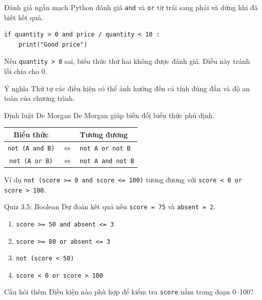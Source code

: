 \documentclass[aspectratio=169,11pt]{beamer}
\newcommand{\code}[1]{\texttt{#1}}
\newcommand{\smallgap}{\vspace{0.4em}}
\begin{document}
\begin{frame}[fragile]{Đánh giá ngắn mạch}
Python đánh giá \code{and} và \code{or} từ trái sang phải và dừng khi đã biết kết quả.
\begin{lstlisting}[style=py]
if quantity > 0 and price / quantity < 10 :
    print("Good price")
\end{lstlisting}
\smallgap
Nếu \code{quantity > 0} sai, biểu thức thứ hai không được đánh giá. Điều này tránh lỗi chia cho 0.
\smallgap
\begin{block}{Ý nghĩa}
Thứ tự các điều kiện có thể ảnh hưởng đến cả tính đúng đắn và độ an toàn của chương trình.
\end{block}
\end{frame}

\begin{frame}{Định luật De Morgan}
De Morgan giúp biến đổi biểu thức phủ định.
\begin{center}
\begin{tabular}{ccl}
\toprule
Biểu thức & & Tương đương \\
\midrule
\code{not (A and B)} & $\Leftrightarrow$ & \code{not A or not B} \\
\code{not (A or B)}  & $\Leftrightarrow$ & \code{not A and not B} \\
\bottomrule
\end{tabular}
\end{center}
\begin{exampleblock}{Ví dụ}
\code{not (score >= 0 and score <= 100)} tương đương với \code{score < 0 or score > 100}.
\end{exampleblock}
\end{frame}



\begin{frame}{Quiz 3.5: Boolean}
Dự đoán kết quả nếu \code{score = 75} và \code{absent = 2}.
\begin{enumerate}
  \item \code{score >= 50 and absent <= 3}
  \item \code{score >= 80 or absent <= 3}
  \item \code{not (score < 50)}
  \item \code{score < 0 or score > 100}
\end{enumerate}
\vspace{0.5em}
\begin{exampleblock}{Câu hỏi thêm}
Điều kiện nào phù hợp để kiểm tra \code{score} nằm trong đoạn 0--100?
\end{exampleblock}
\end{frame}
\end{document}
